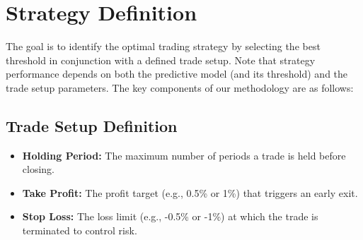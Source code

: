 \documentclass[11pt]{article}
\begin{document}



\section{Strategy Definition}
The goal is to identify the optimal trading strategy by selecting the best threshold in conjunction with a defined trade setup. Note that strategy performance depends on both the predictive model (and its threshold) and the trade setup parameters. The key components of our methodology are as follows:

\subsection*{Trade Setup Definition}
\begin{itemize}
    \item \textbf{Holding Period:} The maximum number of periods a trade is held before closing.
    \item \textbf{Take Profit:} The profit target (e.g., 0.5\% or 1\%) that triggers an early exit.
    \item \textbf{Stop Loss:} The loss limit (e.g., -0.5\% or -1\%) at which the trade is terminated to control risk.
\end{itemize}
\end{document}
